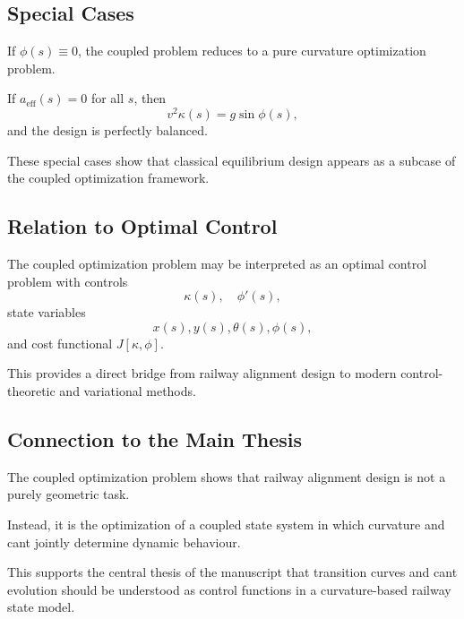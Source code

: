 \subsection{Special Cases}

\begin{proposition}
If \(\phi(s)\equiv 0\), the coupled problem reduces to a pure curvature
optimization problem.
\end{proposition}

\begin{proposition}
If \(a_{\mathrm{eff}}(s)=0\) for all \(s\), then
\[
v^2 \kappa(s)=g\sin\phi(s),
\]
and the design is perfectly balanced.
\end{proposition}

\begin{remark}
These special cases show that classical equilibrium design appears as a
subcase of the coupled optimization framework.
\end{remark}

\subsection{Relation to Optimal Control}

\begin{remark}
The coupled optimization problem may be interpreted as an optimal
control problem with controls
\[
\kappa(s), \quad \phi'(s),
\]
state variables
\[
x(s),y(s),\theta(s),\phi(s),
\]
and cost functional \(J[\kappa,\phi]\).
\end{remark}

\begin{remark}
This provides a direct bridge from railway alignment design to modern
control-theoretic and variational methods.
\end{remark}

\subsection{Connection to the Main Thesis}

\begin{summary}
The coupled optimization problem shows that railway alignment design is
not a purely geometric task.

Instead, it is the optimization of a coupled state system in which
curvature and cant jointly determine dynamic behaviour.

This supports the central thesis of the manuscript that transition
curves and cant evolution should be understood as control functions in a
curvature-based railway state model.
\end{summary}

